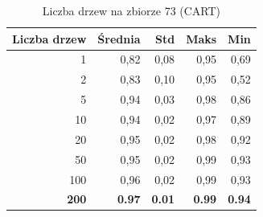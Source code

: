 \begin{table}[htbp]
\centering
\small
\setlength{\tabcolsep}{6pt}
\renewcommand{\arraystretch}{1.2}
\caption{Liczba drzew na zbiorze 73 (CART)}
\label{tab:CART_tree_count_73}
\begin{tabular}{r|r|r|r|r}
\toprule
Liczba drzew & Średnia & Std & Maks & Min \\
\hline
1 & 0,82 & 0,08 & 0,95 & 0,69 \\
2 & 0,83 & 0,10 & 0,95 & 0,52 \\
5 & 0,94 & 0,03 & 0,98 & 0,86 \\
10 & 0,94 & 0,02 & 0,97 & 0,89 \\
20 & 0,95 & 0,02 & 0,98 & 0,92 \\
50 & 0,95 & 0,02 & 0,99 & 0,93 \\
100 & 0,96 & 0,02 & 0,99 & 0,93 \\
\textbf{200} & \textbf{0.97} & \textbf{0.01} & \textbf{0.99} & \textbf{0.94} \\
\bottomrule
\end{tabular}
\end{table}